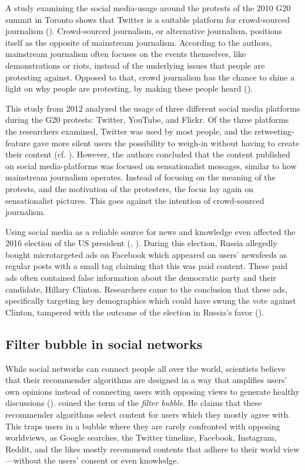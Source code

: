 A study examining the social media-usage around the protests of the 2010 G20 summit in Toronto shows that Twitter is a suitable platform for crowd-sourced journalism (\cite{poell2012twitter}). Crowd-sourced journalism, or alternative journalism, positions itself as the opposite of mainstream journalism. According to the authors, mainstream journalism often focuses on the events themselves, like demonstrations or riots, instead of the underlying issues that people are protesting against. Opposed to that, crowd journalism has the chance to shine a light on why people are protesting, by making these people heard (\cite[698]{poell2012twitter}). 

This study from 2012 analyzed the usage of three different social media platforms during the G20 protests: Twitter, YouTube, and Flickr. Of the three platforms the researchers examined, Twitter was used by most people, and the retweeting-feature gave more silent users the possibility to weigh-in without having to create their content (cf. \cite[709]{poell2012twitter}). However, the authors concluded that the content published on social media-platforms was focused on sensationalist messages, similar to how mainstream journalism operates. Instead of focusing on the meaning of the protests, and the motivation of the protesters, the focus lay again on sensationalist pictures. This goes against the intention of crowd-sourced journalism.

Using social media as a reliable source for news and knowledge even affected the 2016 election of the US president (\cite{duttSenatorWeSell2018}, \cite{ribeiroMicrotargetingSociallyDivisive2019}). During this election, Russia allegedly bought microtargeted ads on Facebook which appeared on users' newsfeeds as regular posts with a small tag claiming that this was paid content. These paid ads often contained false information about the democratic party and their candidate, Hillary Clinton. Researchers came to the conclusion that these ads, specifically targeting key demographics which could have swung the vote against Clinton, tampered with the outcome of the election in Russia's favor (\cite{duttSenatorWeSell2018}).

\subsection{Filter bubble in social networks}
While social networks can connect people all over the world, scientists believe that their recommender algorithms are designed in a way that amplifies users' own opinions instead of connecting users with opposing views to generate healthy discussions (\cite{pariser2011filter}). \citeauthor{pariser2011filter} coined the term of the \emph{filter bubble}. He claims that these recommender algorithms select content for users which they mostly agree with. This traps users in a bubble where they are rarely confronted with opposing worldviews, as Google searches, the Twitter timeline, Facebook, Instagram, Reddit, and the likes mostly recommend contents that adhere to their world view---without the users' consent or even knowledge.

